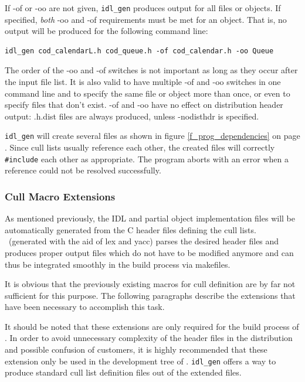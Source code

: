 If -of or -oo are not given, \texttt{idl\_gen} produces output for all 
files or objects.  If specified, \emph{both} -oo and -of requirements must 
be met for an object.  That is, no output will be produced for the 
following command line:

\begin{Verbatim}[fontsize=\small, frame=single]
idl_gen cod_calendarL.h cod_queue.h -of cod_calendar.h -oo Queue
\end{Verbatim}

The order of the -oo and -of switches is not important as long as they occur 
after the input file list. It is also valid to have multiple -of and -oo
switches in one command line and to specify the same file or object more than 
once, or even to specify files that don't exist.
-of and -oo have no effect on distribution header output: .h.dist files are 
always produced, unless -nodisthdr is specified.

\texttt{idl\_gen} will create several files as shown in figure
\ref{f_prog_dependencies} on page \pageref{f_prog_dependencies}.
Since cull lists usually reference each other, the created files
will correctly \texttt{\#include} each other as appropriate. The program aborts
with an error when a reference could not be resolved successfully.

\subsubsection{Cull Macro Extensions}
As mentioned previously, the IDL and partial object implementation
files will be automatically 
generated from the C header files defining the cull lists. \idlgen\ 
(generated with the aid of lex and yacc) parses the desired header files 
and produces proper output files which do not have to be modified anymore and 
can thus be integrated smoothly in the build process via makefiles.

It is obvious that the previously existing macros for cull definition are by
far not sufficient for this purpose. The following paragraphs describe the 
extensions that have been necessary to accomplish this task.

It should be noted that these extensions are only required for the build
process of \qidl. In order to avoid unnecessary complexity of the header
files in the distribution and possible confusion of customers, it is highly
recommended that these extension only be used in the development tree of
\codine. \texttt{idl\_gen} offers a way to
produce standard cull list definition files out of the extended files.

